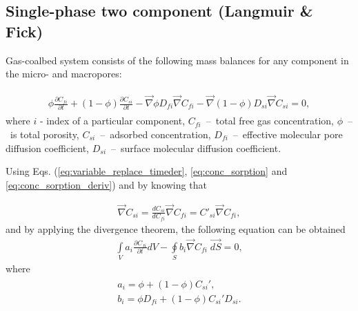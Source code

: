 \documentclass[a4paper,14pt,english]{extreport}
\begin{document}
 \subsection*{Single-phase two component (Langmuir \& Fick)}
 Gas-coalbed system consists of the following mass balances for any component in the micro- and macropores:
 
 \begin{eqnarray}
 \begin{gathered}
 \label{eq:diffusuin_multicomp_diff}
  \phi\frac{\partial C_{fi}}{\partial t} + \left(1-\phi\right)\frac{\partial C_{si}}{\partial t} - \vec{\nabla} \phi D_{fi} \vec{\nabla}C_{fi} - \vec{\nabla}\left(1-\phi \right) D_{si} \vec{\nabla}C_{si} = 0,
   \end{gathered}
 \end{eqnarray}
 where $i$ - index of  a particular component, $C_{fi}$~--~total free gas concentration, $\phi$~--~is total porosity, $C_{si}$~--~adsorbed concentration, $D_{fi}$~--~effective molecular pore diffusion coefficient, $D_{si}$~--~surface molecular diffusion coefficient.
 
 Using Eqs. (\ref{eq:variable_replace_timeder}, \ref{eq:conc_sorption} and \ref{eq:conc_sorption_deriv}) and by knowing that
 
  \begin{eqnarray}
 \label{eq:variable_replace}
\vec\nabla C_{si} =  \frac{dC_{si}}{dC_{fi}}\vec\nabla C_{fi} = C'_{si}\vec\nabla C_{fi},
 \end{eqnarray}
and by applying the divergence theorem, the following equation can be obtained
  \begin{eqnarray}
 \label{eq:diffusuin_multicomp_integral}
 \int \limits_{V} a_{i} \frac{\partial C_{fi}}{\partial t} d V - \oint \limits_{S} b_{i} \vec{\nabla}C_{fi} \; \vec{dS} = 0,
 \end{eqnarray}
where  
 \begin{eqnarray}
 \begin{gathered}
 \label{eq:alpha}
 a_{i}  =  \phi + \left(1-\phi \right)C_{si}', \\ 
 b_{i}  = \phi D_{fi} + \left(1-\phi \right) C_{si}'D_{si}.
 \end{gathered}
 \end{eqnarray}

 
\end{document}

